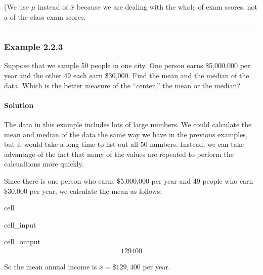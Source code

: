 \documentclass[letterpaper,10pt,english]{jupyterBook}
\begin{document}
\sphinxAtStartPar
(We use \(\mu\) instead of \(\bar{x}\) because we are dealing with the whole  of exam scores, not a  of the class exam scores.


\bigskip\hrule\bigskip



\subsubsection{Example 2.2.3}
\label{\detokenize{Ch2 Descriptive Statistics/2.2 Measures of Central Tendency:example-2-2-3}}
\sphinxAtStartPar
Suppose that we sample 50 people in one city. One person earns \$5,000,000 per year and the other 49 each earn \$30,000. Find the mean and the median of the data. Which is the better measure of the “center,” the mean or the median?


\paragraph{Solution}
\label{\detokenize{Ch2 Descriptive Statistics/2.2 Measures of Central Tendency:id1}}
\sphinxAtStartPar
The data in this example includes lots of large numbers. We could calculate the mean and median of the data the same way we have in the previous examples, but it would take a long time to list out all 50 numbers. Instead, we can take advantage of the fact that many of the values are repeated to perform the calcualtions more quickly.

\sphinxAtStartPar
Since there is one person who earns \$5,000,000 per year and 49 people who earn \$30,000 per year, we calculate the mean as follows:

\begin{sphinxuseclass}{cell}\begin{sphinxVerbatimInput}

\begin{sphinxuseclass}{cell_input}
\begin{sphinxVerbatim}[commandchars=\\\{\}]
\end{sphinxVerbatim}

\end{sphinxuseclass}\end{sphinxVerbatimInput}
\begin{sphinxVerbatimOutput}

\begin{sphinxuseclass}{cell_output}\begin{equation*}
\begin{split}129400\end{split}
\end{equation*}
\end{sphinxuseclass}\end{sphinxVerbatimOutput}

\end{sphinxuseclass}
\sphinxAtStartPar
So the mean annual income is \(\bar{x} = \$129,400\) per year.
\end{document}
